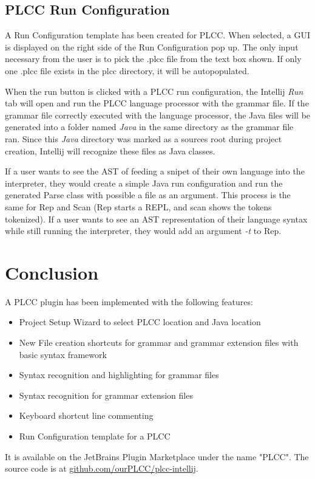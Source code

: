 \documentclass[conference, letterpaper]{IEEEtran}
\begin{document}
\subsection{PLCC Run Configuration}\label{subsec:plcc-run-configuration}
A Run Configuration template has been created for PLCC\@.
When selected, a GUI is displayed on the right side of the Run Configuration pop up.
The only input necessary from the user is to pick the .plcc file from the text box shown.
If only one .plcc file exists in the plcc directory, it will be autopopulated.

When the run button is clicked with a PLCC run configuration, the Intellij \textit{Run} tab will open and run the PLCC language processor with the grammar file.
If the grammar file correctly executed with the language processor, the Java files will be generated into a folder named \textit{Java} in the same directory as the grammar file ran.
Since this \textit{Java} directory was marked as a sources root during project creation, Intellij will recognize these files as Java classes.

If a user wants to see the AST of feeding a snipet of their own language into the interpreter, they would create a simple Java run configuration and run the generated Parse class with possible a file as an argument.
This process is the same for Rep and Scan (Rep starts a REPL, and scan shows the tokens tokenized).
If a user wants to see an AST representation of their language syntax while still running the interpreter, they would add an argument \textit{-t} to Rep.


\section{Conclusion}\label{sec:conclusion}
A PLCC plugin has been implemented with the following features:
\begin{itemize}
    \item Project Setup Wizard to select PLCC location and Java location
    \item New File creation shortcuts for grammar and grammar extension files with basic syntax framework
    \item Syntax recognition and highlighting for grammar files
    \item Syntax recognition for grammar extension files
    \item Keyboard shortcut line commenting
    \item Run Configuration template for a PLCC
\end{itemize}
It is available on the JetBrains Plugin Marketplace under the name "PLCC".
The source code is at \href{https://github.com/ourPLCC/plcc-intellij}{github.com/ourPLCC/plcc-intellij}.
\end{document}
